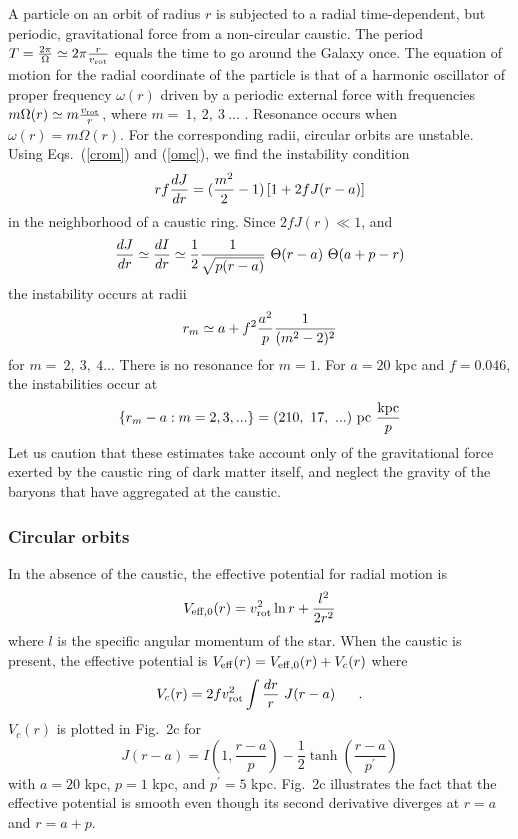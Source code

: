 \documentclass[aps,prd,preprint,tightenlines,floatfix,showpacs,groupedaddress]{revtex4}
\begin{document}
{A particle on an orbit of radius $r$ is subjected to a radial 
time-dependent, but periodic, gravitational force from a 
non-circular caustic.  The period 
$T = {2 \pi \over \Omega} \simeq 2 \pi {r \over v_{\rm rot}}$
equals the time to go around the Galaxy once.  The equation of 
motion for the radial coordinate of the particle is that of 
a harmonic oscillator of proper frequency $\omega(r)$ driven 
by a periodic external force with frequencies 
$m \Omega(r) \simeq m {v_{\rm rot} \over r}$, where 
$m =~1,~2,~3~...$ .   Resonance occurs when $\omega(r) = 
m \Omega (r)$.  For the corresponding radii, circular orbits 
are unstable.  Using Eqs.~(\ref{crom}) and (\ref{omc}), we 
find the instability condition 
\begin{equation}
r f {d J \over dr} = ({m^2 \over 2} - 1) \left[1 + 2 f J(r-a)\right]
\label{instc}
\end{equation}
in the neighborhood of a caustic ring.  Since $2 f J(r) \ll 1$, and 
\begin{equation}
{d J \over dr} \simeq {d I \over dr} \simeq 
{1 \over 2} {1 \over \sqrt{p(r-a)}}~\Theta (r-a)~\Theta (a+p-r)
\label{dIdr}
\end{equation}
the instability occurs at radii
\begin{equation}
r_m \simeq a + f^2 {a^2 \over p} {1 \over (m^2 - 2)^2}
\label{inrad}
\end{equation}
for $m =~2,~3,~4 ...$  There is no resonance for $m=1$.  For 
$a = 20$ kpc and $f = 0.046$, the instabilities occur at 
\begin{equation}
\{r_m - a: m = 2, 3, ... \} = 
(210,~17,~...)~{\rm pc}~{{\rm kpc} \over p}
\label{rmma}
\end{equation}
Let us caution that these estimates take account only of the 
gravitational force exerted by the caustic ring of dark matter 
itself, and neglect the gravity of the baryons that have aggregated
at the caustic.

\subsubsection{Circular orbits}

In the absence of the caustic, the effective potential for radial 
motion is 
\begin{equation} 
V_{{\rm eff},0}(r) = v^2_{\rm rot} \ln r + \frac{l^2}{2r^2} 
\label{Veff}
\end{equation} 
where $l$ is the specific angular momentum of the star. When 
the caustic is present, the effective potential is 
$V_{\rm eff}(r) = V_{{\rm eff},0}(r) + V_c(r)$ where
\begin{equation} 
V_c(r) = 2 f v_{\rm rot}^2 \int \frac{dr}{r}~J(r-a)~~~~\ .
\label{Vcr}
\end{equation} 
$V_c(r)$ is plotted in Fig.~2c for
\begin{equation} 
J(r-a) = I(1,\frac{r-a}{p}) - 
\frac{1}{2} \tanh\left(\frac{r-a}{p^{'}} \right) 
\end{equation} 
with $a = 20$ kpc, $p = 1$ kpc, and $p^{'} = 5$ kpc. Fig.~2c 
illustrates the fact that the effective potential is smooth 
even though its second derivative diverges at $r=a$ and $r=a+p$. 

}
\end{document}
